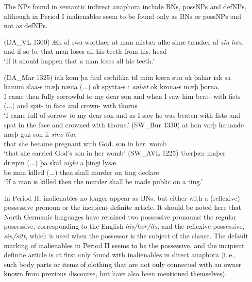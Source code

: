 \documentclass[output=paper]{langsci/langscibook}
\begin{document}
\filbreak
The NPs found in semantic indirect anaphora include BNs, possNPs and defNPs, although in Period I inalienables seem to be found only as BNs or possNPs and not as defNPs. 

\begin{exe}
\begin{samepage}
\ex\label{6ex:19}
(DA\_VL 1300)
\exi{}
\gll Æn of swa {worthær} at man {mistær} allæ sinæ {tændær} af {\emph{sin}} {\emph{høs}}.\\
%
and if so be {that} man loses all his teeth {from} {his.{}} head \\
%
\glt `If it should happen that a man loses all his teeth.'
\end{samepage}
\ex\label{6ex:20}
(DA\_Mar 1325)
\exi{}
\gll iak kom þa fuul sørhilika til miin kæra sun ok þahar iak sa hanum slaa-s mæþ næua (...) ok spytta-s i {\emph{anlæt}} ok krona-s mæþ þorna. \\
%
I came then fully sorrowful to my dear son and when I saw him beat-{} with fists (...) and spit-{} in face and crown-{} with thorns \\
%
\glt `I came full of sorrow to my dear son and as I saw he was beaten with fists and spat in the face and crowned with thorns.' 
\ex\label{6ex:21}
(SW\_Bur 1330)
\exi{}
\gll at hon varþ hauande mæþ guz son ii {\emph{sino}} {\emph{liue}}\\
that she became pregnant with God.{} son in her.{} womb\\
\glt `that she carried God's son in her womb'
\ex\label{6ex:22}
(SW\_AVL 1225)
\exi{}
\gll Uærþær maþer dræpin (...) þa skal {\emph{uighi}} a þingi lysæ. \\
be man killed (...) then shall murder on ting declare \\
\glt `If a man is killed then the murder shall be made public on a ting.' \\
\end{exe}

{
In Period II, inalienables no longer appear as BNs, but either with a (reflexive) possessive pronoun or the incipient definite article. It should be noted here that North Germanic languages have retained two possessive pronouns: the regular possessive, corresponding to the English {\emph{his/her/its}}, and the reflexive possessive, {\emph{sin/sitt}}, which is used when the possessor is the subject of the clause. The default marking of inalienables in Period II seems to be the possessive, and the incipient definite article is at first only found with inalienables in direct anaphora (i.\,e., such body parts or items of clothing that are not only connected with an owner known from previous discourse, but have also been mentioned themselves).
}
\end{document}
